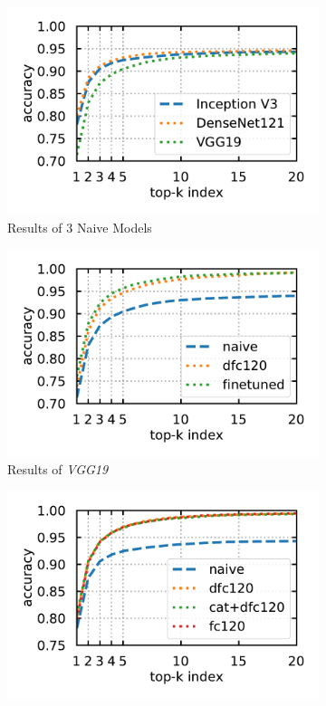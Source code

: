 \documentclass{article}
\begin{document}
\begin{figure}[h]
	\centering
	\caption{Results of Top-$k$ Accuracy Verses $k$ index}
	\label{fig:plot}
	\begin{subfigure}{0.48\linewidth}
		\centering
		\includegraphics[width=\linewidth]{pics/Model_naive}
		\caption{Results of $3$ Naive Models}
		\label{fig:all3}
	\end{subfigure} 
	\begin{subfigure}{0.48\linewidth}
		\centering
		\includegraphics[width=\linewidth]{pics/vgg19_acc}
		\caption{Results of \emph{VGG19}}
		\label{fig:vgg19}
	\end{subfigure} 
	\begin{subfigure}{0.48\linewidth}
		\centering
		\includegraphics[width=\linewidth]{pics/InceptionV3}

\end{subfigure}
\end{figure}
\end{document}
